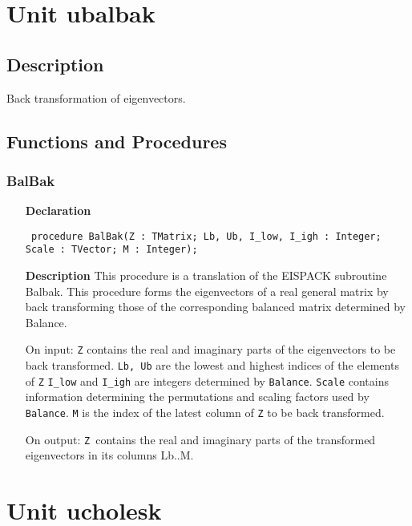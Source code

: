 \documentclass[12pt,a4paper,oneside]{report}
\newcommand{\declarationitem}[1]{\textbf{#1}}
\newcommand{\descriptiontitle}[1]{\textbf{#1}}
\newcommand{\code}[1]{\texttt{#1}}
\begin{document}
\section{Unit ubalbak}
\label{ubalbak}
\subsection{Description}
Back transformation of eigenvectors. 
\subsection{Functions and Procedures}
\subsubsection{BalBak}
\label{ubalbak-BalBak}
\begin{itemize}\item[\declarationitem{Declaration}\hfill]
	\begin{flushleft}
		\code{
			procedure BalBak(Z : TMatrix; Lb, Ub, I{\_}low, I{\_}igh : Integer; Scale : TVector; M : Integer);}
		
	\end{flushleft}
	
	\par
	\item[\descriptiontitle{Description}]
	This procedure is a translation of the EISPACK subroutine Balbak. This procedure forms the eigenvectors of a real general matrix by back transforming those of the corresponding balanced matrix determined by Balance. 
	
	On input: \code{Z} contains the real and imaginary parts of the eigenvectors to be back transformed. \code{Lb, Ub} are the lowest and highest indices of the elements of \code{Z} \code{I{\_}low} and \code{I{\_}igh} are integers determined by \code{Balance}. \code{Scale} contains information determining the permutations and scaling factors used by \code{Balance}. \code{M} is the index of the latest column of \code{Z} to be back transformed.
	
	On output: \code{Z }contains the real and imaginary parts of the transformed eigenvectors in its columns Lb..M.
	
\end{itemize}
\section{Unit ucholesk}
\label{ucholesk}
\end{document}
